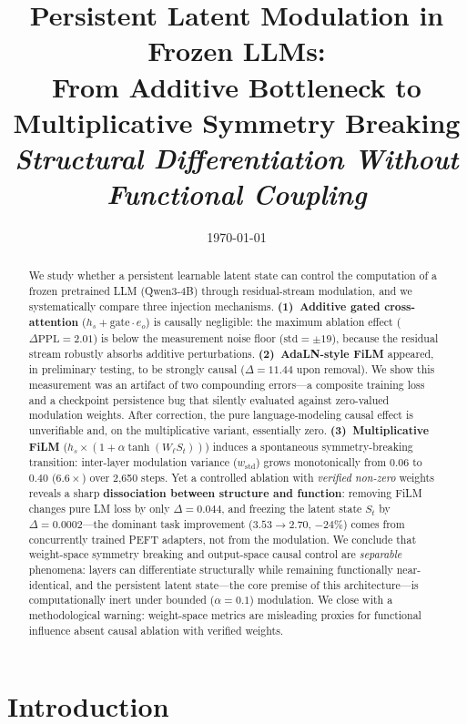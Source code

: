 \documentclass[11pt,a4paper]{article}
\title{
  \textbf{Persistent Latent Modulation in Frozen LLMs:}\\[0.3em]
  \large From Additive Bottleneck to Multiplicative Symmetry Breaking\\[0.2em]
  \normalsize\textit{Structural Differentiation Without Functional Coupling}
}
\author{
  Xiao Ouyang \textup{(\begin{CJK}{UTF8}{gbsn}欧阳潇\end{CJK})}
}
\date{\today}
\newcommand{\St}{S_t}
\newcommand{\wstd}{w_{\mathrm{std}}}
\begin{document}
\maketitle
\thispagestyle{empty}

\begin{abstract}
We study whether a persistent learnable latent state can control the computation of a
frozen pretrained LLM (Qwen3-4B) through residual-stream modulation, and we
systematically compare three injection mechanisms. \textbf{(1)~Additive gated
cross-attention} ($h_s + \mathrm{gate}\cdot e_o$) is causally negligible: the maximum
ablation effect ($\Delta\mathrm{PPL} = 2.01$) is below the measurement noise floor
($\mathrm{std}=\pm 19$), because the residual stream robustly absorbs additive
perturbations. \textbf{(2)~AdaLN-style FiLM} appeared, in preliminary testing, to be
strongly causal ($\Delta = 11.44$ upon removal). We show this measurement was an
artifact of two compounding errors---a composite training loss and a checkpoint
persistence bug that silently evaluated against zero-valued modulation weights. After
correction, the pure language-modeling causal effect is unverifiable and, on the
multiplicative variant, essentially zero. \textbf{(3)~Multiplicative FiLM}
($h_s \times (1+\alpha\tanh(W_\ell S_t))$) induces a spontaneous symmetry-breaking
transition: inter-layer modulation variance ($\wstd$) grows monotonically from $0.06$
to $0.40$ ($6.6\times$) over 2{,}650 steps. Yet a controlled ablation with
\emph{verified non-zero} weights reveals a sharp \textbf{dissociation between structure
and function}: removing FiLM changes pure LM loss by only $\Delta = 0.044$, and
freezing the latent state $\St$ by $\Delta = 0.0002$---the dominant task improvement
($3.53 \to 2.70$, $-24\%$) comes from concurrently trained PEFT adapters, not from the
modulation. We conclude that weight-space symmetry breaking and output-space causal
control are \emph{separable} phenomena: layers can differentiate structurally while
remaining functionally near-identical, and the persistent latent state---the core
premise of this architecture---is computationally inert under bounded
($\alpha = 0.1$) modulation. We close with a methodological warning: weight-space
metrics are misleading proxies for functional influence absent causal ablation with
verified weights.
\end{abstract}

\newpage
\setcounter{page}{1}

\section{Introduction}
\end{document}
